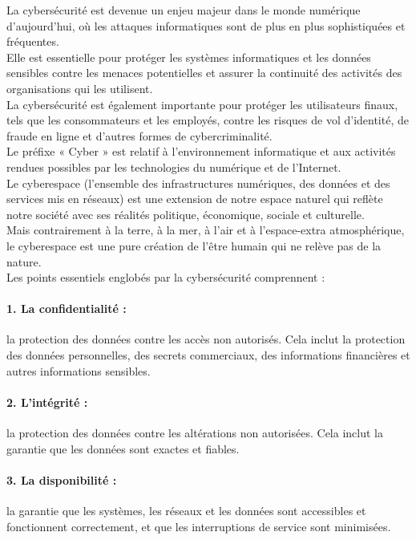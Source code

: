 La cybersécurité est devenue un enjeu majeur dans le monde numérique d'aujourd'hui, où les attaques informatiques sont de plus en plus sophistiquées et fréquentes.\\
 Elle est essentielle pour protéger les systèmes informatiques et les données sensibles contre les menaces potentielles et assurer la continuité des activités des organisations qui les utilisent.\\
  La cybersécurité est également importante pour protéger les utilisateurs finaux, tels que les consommateurs et les employés, contre les risques de vol d'identité, de fraude en ligne et d'autres formes de cybercriminalité.\\
Le préfixe « Cyber » est relatif à l’environnement informatique et aux activités
rendues possibles par les technologies du numérique et de l’Internet.\\
 Le cyberespace (l’ensemble des infrastructures numériques, des données et des services mis en réseaux) est une extension de notre espace naturel qui reflète notre société avec ses réalités politique, économique, sociale et culturelle.\\
  Mais contrairement à la terre, à la mer, à l’air et à l’espace-extra atmosphérique, le cyberespace est une pure création de l’être humain qui ne relève pas de la nature.\\

Les points essentiels englobés par la cybersécurité comprennent :
\space 
 
 \paragraph{1. La confidentialité :\\}la protection des données contre les accès non autorisés. Cela inclut la protection des données personnelles, des secrets commerciaux, des informations financières et autres informations sensibles.

 \paragraph{2. L'intégrité :\\}  la protection des données contre les altérations non autorisées. Cela inclut la garantie que les données sont exactes et fiables.

 \paragraph{3. La disponibilité :\\}  la garantie que les systèmes, les réseaux et les données sont accessibles et fonctionnent correctement, et que les interruptions de service sont minimisées.

